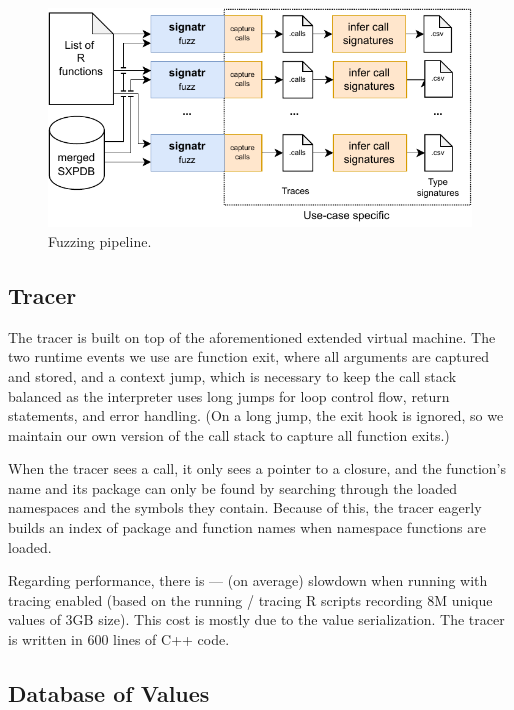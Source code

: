 \documentclass[sigplan,nonacm,anonymous,review]{acmart}
\begin{document}
\begin{figure}
    \centering
    \includegraphics[width=\columnwidth]{code-and-figures/fuzz-pipeline.pdf}
    \caption{    Fuzzing pipeline.    }\label{fig:fuzz-pipeline}
\end{figure}

\subsection{Tracer}\label{sec:argtracer}

The tracer is built on top of the aforementioned extended virtual machine.
The two runtime events we use are function exit, where all arguments are
captured and stored, and a context jump, which is necessary to keep
the call stack balanced as the interpreter uses long jumps for loop
control flow, return statements, and error handling.  (On a long jump,
the exit hook is ignored, so we maintain our own version of the call stack
to capture all function exits.)

When the tracer sees a call, it only sees a pointer to a closure, and the
function's name and its package can only be found by searching through
the loaded name\-spaces and the symbols they contain.  Because of this,
the tracer eagerly builds an index of package and function names when
name\-space functions are loaded.

Regarding performance, there is \TRMinTracingOverhead ---
\TRMaxTracingOverhead (\TRAvgTracingOverhead on average) slowdown when
running with tracing enabled (based on the running / tracing
\TRTracingFiles R scripts recording 8M unique values of 3GB size).
This cost is mostly due to the value serialization.  The tracer is written in 600 lines of
C++ code.

\subsection{Database of Values}\label{sec:sxpdb}
\end{document}
